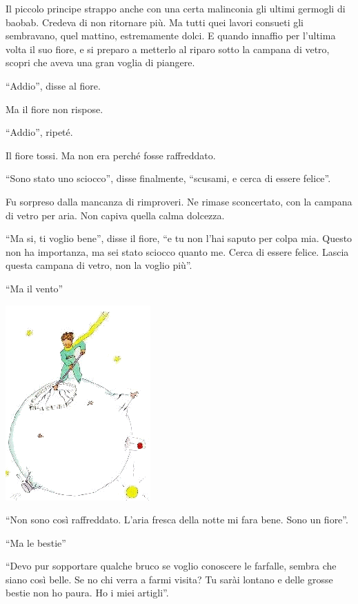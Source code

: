 \documentclass[11pt]{scrbook}
\begin{document}
Il piccolo principe strappo anche con una certa malinconia gli ultimi
germogli di baobab. Credeva di non ritornare più. Ma tutti quei lavori
consueti gli sembravano, quel mattino, estremamente dolci. E quando
innaffio per l'ultima volta il suo fiore, e si preparo a metterlo al
riparo sotto la campana di vetro, scopri che aveva una gran voglia di
piangere.

``Addio'', disse al fiore.

Ma il fiore non rispose.

``Addio'', ripeté.

Il fiore tossi. Ma non era perché fosse raffreddato.

``Sono stato uno sciocco'', disse finalmente, ``scusami, e cerca di
essere felice''.

Fu sorpreso dalla mancanza di rimproveri. Ne rimase sconcertato, con la
campana di vetro per aria. Non capiva quella calma dolcezza.

``Ma si, ti voglio bene'', disse il fiore, ``e tu non l'hai saputo per
colpa mia. Questo non ha importanza, ma sei stato sciocco quanto me.
Cerca di essere felice. Lascia questa campana di vetro, non la voglio
più''.

``Ma il vento''

\begin{center}
\includegraphics{img/9a}
\end{center}

``Non sono così raffreddato. L'aria fresca della notte mi fara bene.
Sono un fiore''.

``Ma le bestie''

``Devo pur sopportare qualche bruco se voglio conoscere le farfalle,
sembra che siano così belle. Se no chi verra a farmi visita? Tu sarài
lontano e delle grosse bestie non ho paura. Ho i miei artigli''.
\end{document}
